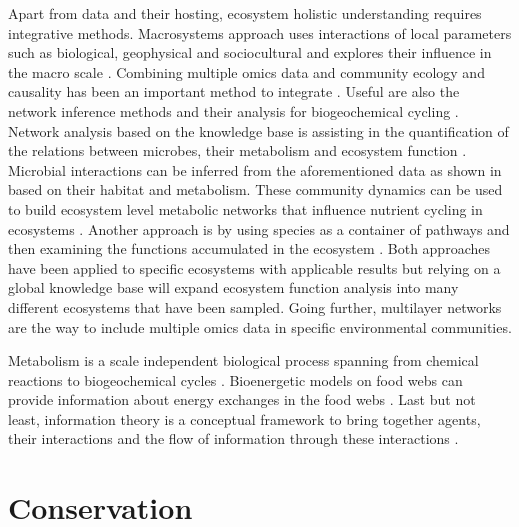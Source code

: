 Apart from data and their hosting, ecosystem holistic understanding requires
integrative methods. Macrosystems approach uses interactions of local parameters
such as biological, geophysical and sociocultural and explores their influence in
the macro scale \parencite{heffernan2014}. Combining multiple omics data and community ecology and causality has
been an important method to integrate \parencite{jurburg2022community}. Useful are also the network inference methods 
and their analysis for biogeochemical cycling \parencite{jameson2023Network}.
Network analysis based on the knowledge base is assisting in the quantification
of the relations between microbes, their metabolism and ecosystem
function \parencite{graham2016Microbes,muller2018Using, perez_garcia2016Metabolic}.
Microbial interactions can be inferred from the aforementioned data as shown
in \parencite{machado2021Polarization} based on their habitat and metabolism.
These community dynamics can be used to build ecosystem level metabolic
networks \parencite{perez_garcia2016Metabolic} that influence nutrient cycling in
ecosystems \parencite{bauer2018Network}. Another approach is by using species as a
container of pathways and then examining the functions accumulated in the
ecosystem \parencite{loucaDecouplingFunctionTaxonomy2016}. Both approaches have
been applied to specific ecosystems with applicable results but relying on a
global knowledge base will expand ecosystem function analysis into many
different ecosystems that have been sampled.
Going further, multilayer networks \parencite{marine-multilayers}
are the way to include multiple omics data in specific environmental communities. 

Metabolism is a scale independent biological process spanning from chemical reactions
to biogeochemical cycles \parencite{hall2018understanding}. Bioenergetic models on food 
webs can provide information about energy exchanges in the food webs \parencite{valdovinos2023bioenergetic}.
Last but not least, information theory is a conceptual framework to bring together agents,
their interactions and the flow of information through these interactions \parencite{oconnor-information-ecology}.


\section{Conservation}
\label{sec:conservation}

